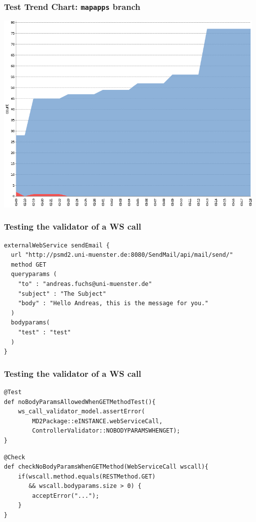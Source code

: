 
\begin{frame}[plain]
\frametitle{Test Trend Chart: \texttt{mapapps} branch}
\plainnumber
\begin{center}
\includegraphics[width=1\textwidth] {images/test-trend-chart-md2-framework.png}
\end{center}
\end{frame}


\begin{frame}[fragile]
\frametitle{Testing the validator of a WS call}

\begin{lstlisting}
externalWebService sendEmail { 
  url "http://psmd2.uni-muenster.de:8080/SendMail/api/mail/send/" 
  method GET 
  queryparams ( 
    "to" : "andreas.fuchs@uni-muenster.de" 
    "subject" : "The Subject" 
    "body" : "Hello Andreas, this is the message for you."
  )
  bodyparams(
    "test" : "test"
  )
}
\end{lstlisting}
\end{frame}

\begin{frame}[fragile]
\frametitle{Testing the validator of a WS call}

\begin{lstlisting}
@Test
def noBodyParamsAllowedWhenGETMethodTest(){
    ws_call_validator_model.assertError(
        MD2Package::eINSTANCE.webServiceCall,
        ControllerValidator::NOBODYPARAMSWHENGET);
}
\end{lstlisting}

\vfill

\begin{lstlisting}
@Check
def checkNoBodyParamsWhenGETMethod(WebServiceCall wscall){
    if(wscall.method.equals(RESTMethod.GET) 
       && wscall.bodyparams.size > 0) {
        acceptError("...");
    }
}
\end{lstlisting}

\end{frame}


